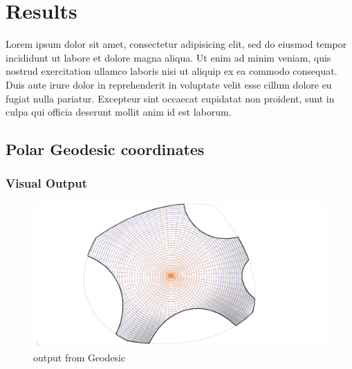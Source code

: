 \chapter{Results}
Lorem ipsum dolor sit amet, consectetur adipisicing elit, sed do eiusmod tempor incididunt ut labore et dolore magna aliqua. Ut enim ad minim veniam, quis nostrud exercitation ullamco laboris nisi ut aliquip ex ea commodo consequat. Duis aute irure dolor in reprehenderit in voluptate velit esse cillum dolore eu fugiat nulla pariatur. Excepteur sint occaecat cupidatat non proident, sunt in culpa qui officia deserunt mollit anim id est laborum.




\section{Polar Geodesic coordinates}
\subsection{Visual Output}

\begin{figure}[H]
\centering
\includegraphics[width=1.0\linewidth ]{figure/Results/geotop2.jpg}
\caption{output from Geodesic}
\end{figure}


